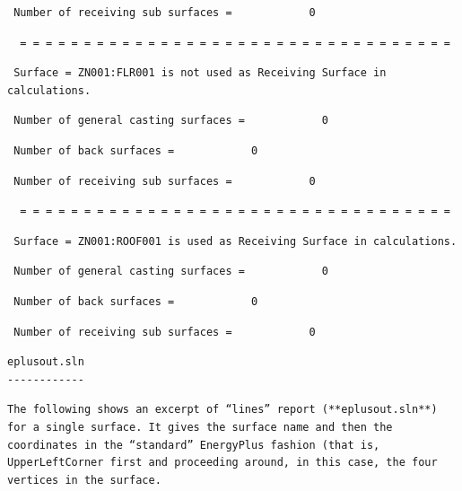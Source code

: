 \begin{lstlisting}
 Number of receiving sub surfaces =            0
\end{lstlisting}

\begin{lstlisting}
  = = = = = = = = = = = = = = = = = = = = = = = = = = = = = = = = = =
\end{lstlisting}

\begin{lstlisting}
 Surface = ZN001:FLR001 is not used as Receiving Surface in calculations.
\end{lstlisting}

\begin{lstlisting}
 Number of general casting surfaces =            0
\end{lstlisting}

\begin{lstlisting}
 Number of back surfaces =            0
\end{lstlisting}

\begin{lstlisting}
 Number of receiving sub surfaces =            0
\end{lstlisting}

\begin{lstlisting}
  = = = = = = = = = = = = = = = = = = = = = = = = = = = = = = = = = =
\end{lstlisting}

\begin{lstlisting}
 Surface = ZN001:ROOF001 is used as Receiving Surface in calculations.
\end{lstlisting}

\begin{lstlisting}
 Number of general casting surfaces =            0
\end{lstlisting}

\begin{lstlisting}
 Number of back surfaces =            0
\end{lstlisting}

\begin{lstlisting}
 Number of receiving sub surfaces =            0
\end{lstlisting}

\begin{lstlisting}
eplusout.sln
------------
\end{lstlisting}

\begin{lstlisting}
The following shows an excerpt of “lines” report (**eplusout.sln**) for a single surface. It gives the surface name and then the coordinates in the “standard” EnergyPlus fashion (that is, UpperLeftCorner first and proceeding around, in this case, the four vertices in the surface.
\end{lstlisting}

